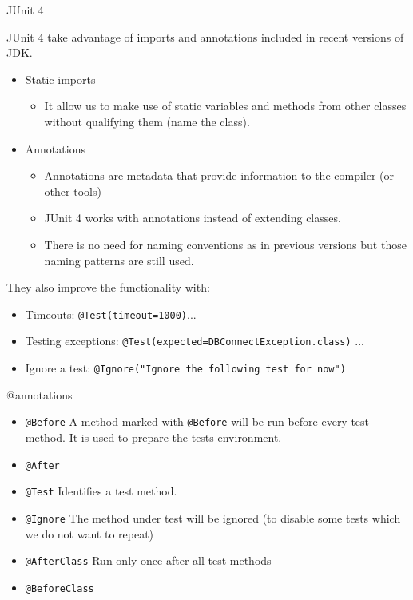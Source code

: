 \documentclass[11pt, xcolor=svgnames]{beamer}
\begin{document}
\begin{frame}{JUnit 4}

JUnit 4 take advantage of imports and annotations included in recent versions of JDK.
\begin{itemize}
 \item Static imports
 
    \begin{itemize}
    \item It allow us to make use of static variables and methods from other classes without qualifying them (name the class).
    \end{itemize}

 \item Annotations 
    \begin{itemize}
    \item Annotations are metadata that provide information to the compiler (or other tools)
    \item JUnit 4 works with annotations instead of extending classes.
    \item There is no need for naming conventions as in previous versions but those naming patterns are still used. 
    \end{itemize}

\end{itemize}

They also improve the functionality with:
\begin{itemize}
 \item Timeouts: \texttt{@Test(timeout=1000)}...
 \item Testing exceptions: \texttt{@Test(expected=DBConnectException.class)} ...
 \item Ignore a test: \texttt{@Ignore("Ignore the following test for now")}
  \end{itemize}


\end{frame}



\begin{frame}{@annotations}

\begin{itemize}
  \item \texttt{@Before} A method marked with \texttt{@Before} will be run before every test method. It is used to prepare the tests environment.
  \item \texttt{@After}
  \item \texttt{@Test} Identifies a test method.
  \item \texttt{@Ignore} The method under test will be ignored (to disable some tests which we do not want to repeat)
  \item \texttt{@AfterClass} Run only once after all test methods
  \item \texttt{@BeforeClass}
  \end{itemize}
\end{frame}
\end{document}
